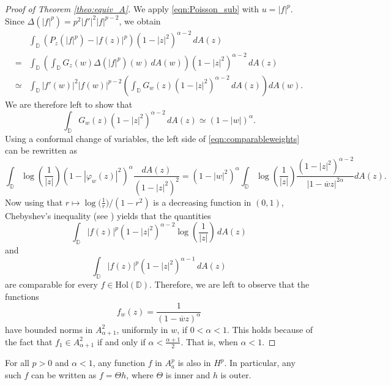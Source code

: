 \documentclass[12pt]{amsart}
\theoremstyle{definition}
\newcommand{\D}{\mathbb{{D}}}
\newcommand{\Hol}{\mathrm{Hol}(\D)}
\numberwithin{equation}{section}
\begin{document}
        \begin{proof}[Proof of Theorem \ref{theo:equiv_A}]
            We apply \eqref{eqn:Poisson_sub} with $u=|f|^p$. Since $\Delta(|f|^p)=p^2 |f'|^2|f|^{p-2}$, we obtain
                \[
                    \begin{split}
                        &\int_\D\left(P_z(|f|^p)-|f(z)|^p\right)(1-|z|^2)^{\alpha-2}\,dA(z)\\
                        =&\int_\D \left(\int_\D G_z(w)\Delta(|f|^p)(w)\,dA(w) \right)(1-|z|^2)^{\alpha-2}\,dA(z)\\
                        \simeq&\int_\D|f'(w)|^2|f(w)|^{p-2} \left(\int_\D G_w(z)(1-|z|^2)^{\alpha-2}\,dA(z) \right) dA(w).
                    \end{split}
                \]
                We are therefore left to show that
                \begin{equation}
                \label{eqn:comparableweights}
                    \int_\D G_w(z)(1-|z|^2)^{\alpha-2}\,dA(z)\simeq (1-|w|)^\alpha.
                \end{equation}
                Using a conformal change of variables, the left side of \eqref{eqn:comparableweights} can be rewritten as
                \[
                    \int_\D \log \left( \dfrac{1}{|z|}\right) (1 - |\varphi_w (z)|^2)^\alpha \dfrac{dA(z)}{(1 - |z|^2)^2} = (1 - |w|^2)^\alpha \int_\D \log \left( \dfrac{1}{|z|}\right)  \dfrac{(1 - |z|^2)^{\alpha - 2}}{|1 - \overline{w} z|^{2\alpha}} dA(z).
                \]
                Now using that $r \mapsto \log\big(\tfrac{1}{r}\big)/(1-r^2)$ is a decreasing function in $(0,1)$, Chebyshev's inequality (see \cite{MR1505400}) yields that the quantities
                \[
                   \int_\D |f(z)|^p (1 - |z|^2)^{\alpha - 2} \log \left( \frac{1}{|z|} \right) \, dA(z) 
                \]
                and
                \[
                    \int_\D |f(z)|^p (1 - |z|^2)^{\alpha - 1} \, dA(z)
                \]
                are comparable for every $f \in \Hol$. Therefore, we are left to observe that the functions
                \[
                    f_w(z)=\frac{1}{(1-\overline wz)^{\alpha}}
                \]
                have bounded norms in $A^2_{\alpha+1}$, uniformly in $w$, if $0<\alpha<1$. This holds because of the fact that $f_1 \in A^2_{\alpha + 1}$ if and only if $\alpha < \frac{\alpha + 1}{2}$. That is, when $\alpha < 1$.
        \end{proof}

        For all $p>0$ and $\alpha<1$, any function $f$ in $A^p_a$ is also in $H^p$. In particular, any such $f$ can be written as $f=\Theta h$, where $\Theta$ is inner and $h$ is outer.
 
\end{document}
